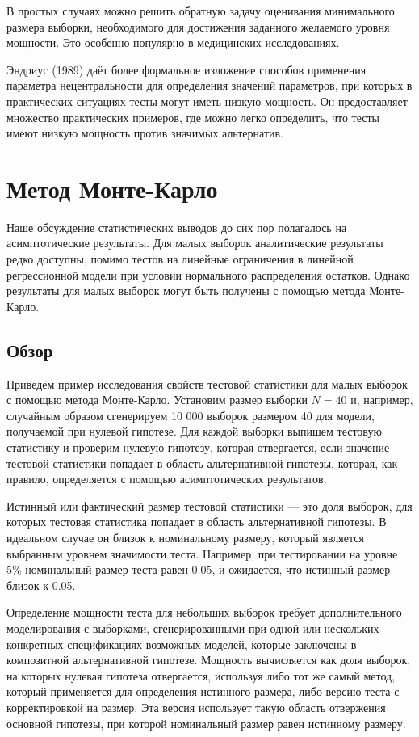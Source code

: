 В простых случаях можно решить обратную задачу оценивания минимального размера выборки, необходимого для достижения заданного желаемого уровня мощности. Это особенно популярно в медицинских исследованиях. 

Эндриус (1989) даёт более формальное изложение способов применения параметра нецентральности для определения значений параметров, при которых в практических ситуациях тесты могут иметь низкую мощность. Он предоставляет множество практических примеров, где можно легко определить, что тесты имеют низкую мощность против значимых альтернатив.

\section{Метод Монте-Карло}

Наше обсуждение статистических выводов до сих пор полагалось на асимптотические результаты. Для малых выборок аналитические результаты редко доступны, помимо тестов на линейные ограничения в линейной регрессионной модели при условии нормального распределения остатков. Однако результаты для малых выборок могут быть получены с помощью метода Монте-Карло.

\subsection{Обзор}

Приведём пример исследования свойств тестовой статистики для малых выборок с помощью метода Монте-Карло. Установим размер выборки $N = 40$ и, например, случайным образом сгенерируем 10 000 выборок размером 40 для модели, получаемой при нулевой гипотезе. Для каждой выборки выпишем тестовую статистику и проверим нулевую гипотезу, которая отвергается, если значение тестовой статистики попадает в область альтернативной гипотезы, которая, как правило, определяется с помощью асимптотических результатов.

Истинный или фактический размер тестовой статистики --- это доля выборок, для которых тестовая статистика попадает в область альтернативной гипотезы. В идеальном случае он близок к номинальному размеру, который является выбранным уровнем значимости теста. Например, при тестировании на уровне 5\% номинальный размер теста равен 0.05, и ожидается, что истинный размер близок к 0.05.

Определение мощности теста для небольших выборок требует дополнительного моделирования с выборками, сгенерированными при одной или нескольких конкретных спецификациях возможных моделей, которые заключены в композитной альтернативной гипотезе. Мощность вычисляется как доля выборок, на которых нулевая гипотеза отвергается, используя либо тот же самый метод, который применяется для определения истинного размера, либо версию теста с корректировкой на размер.  Эта версия использует такую область отвержения основной гипотезы, при которой номинальный размер равен истинному размеру.

